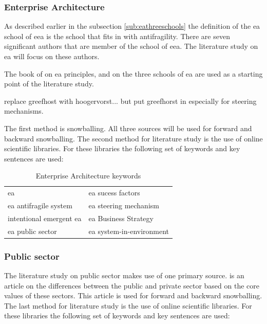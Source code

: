 \subsubsection{Enterprise Architecture}
\label{subsub:enterprisearchitecture}
As described earlier in the subsection \ref{sub:eathreeschools} the definition of the \acrfull{ea} school of \acrfull{eea} is the school that fits in with \gls{antifragility}. There are seven significant authors that are member of the school of \acrshort{eea}. The literature study on \acrshort{ea} will focus on these authors.

The book of \textcite{Greefhorst2011} on \acrshort{ea} principles, and \textcite{Lapalme2012} on the three schools of \acrshort{ea} are used as a starting point of the literature study.

\begin{remark}
replace greefhost with hoogervorst... but put greefhorst in especially for steering mechanisms.
\end{remark}

The first method is snowballing. All three sources will be used for forward and backward snowballing. The second method for literature study is the use of online scientific libraries. For these libraries the following set of keywords and key sentences are used:
\bigskip

\begin{table}[H]
	\centering
\begin{tabular}{p{}p{}}
	\toprule
	\acrlong{ea} & \acrlong{ea} sucess factors\\%
	\acrlong{ea} \gls{antifragile} system	& \acrlong{ea} steering mechanism\\%
	intentional emergent \acrlong{ea} & \acrlong{ea} Business Strategy\\%
	\acrlong{ea} public sector & \acrlong{ea} system-in-environment \\%
	\bottomrule
\end{tabular}
	\caption{Enterprise Architecture keywords}
	\label{tab:enterprisearchitecturekeywords}
\end{table}

\subsubsection{Public sector}
\label{subsub:publicsector}
The literature study on public sector makes use of one primary source. \textcite{Wal2008} is an article on the differences between the public and private sector based on the core values of these sectors. This article is used for forward and backward snowballing. The last method for literature study is the use of online scientific libraries. For these libraries the following set of keywords and key sentences are used:
\bigskip

